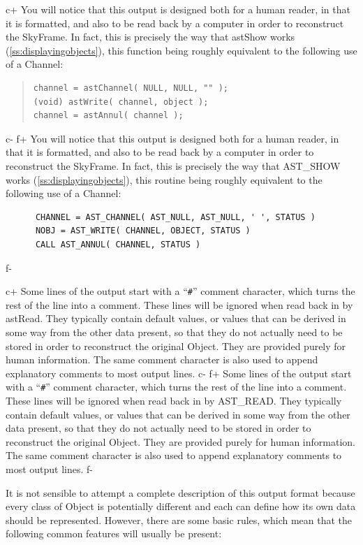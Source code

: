 \documentclass[twoside,11pt]{article}
\newcommand{\secref}[1]{\S\ref{#1}}
\renewcommand{\secref}[1]{\ref{#1}}
\begin{document}
c+
You will notice that this output is designed both for a human reader,
in that it is formatted, and also to be read back by a computer in
order to reconstruct the SkyFrame. In fact, this is precisely the way
that astShow works (\secref{ss:displayingobjects}), this function being
roughly equivalent to the following use of a Channel:

\begin{quote}
\small
\begin{verbatim}
channel = astChannel( NULL, NULL, "" );
(void) astWrite( channel, object );
channel = astAnnul( channel );
\end{verbatim}
\normalsize
\end{quote}
c-
f+
You will notice that this output is designed both for a human reader,
in that it is formatted, and also to be read back by a computer in
order to reconstruct the SkyFrame. In fact, this is precisely the way
that AST\_SHOW works (\secref{ss:displayingobjects}), this routine
being roughly equivalent to the following use of a Channel:

\small
\begin{verbatim}
      CHANNEL = AST_CHANNEL( AST_NULL, AST_NULL, ' ', STATUS )
      NOBJ = AST_WRITE( CHANNEL, OBJECT, STATUS )
      CALL AST_ANNUL( CHANNEL, STATUS )
\end{verbatim}
\normalsize
f-

c+
Some lines of the output start with a ``\verb?#?'' comment character,
which turns the rest of the line into a comment. These lines will be
ignored when read back in by astRead.  They typically contain default
values, or values that can be derived in some way from the other data
present, so that they do not actually need to be stored in order to
reconstruct the original Object. They are provided purely for human
information. The same comment character is also used to append
explanatory comments to most output lines.
c-
f+
Some lines of the output start with a ``\verb?#?'' comment character,
which turns the rest of the line into a comment. These lines will be
ignored when read back in by AST\_READ.  They typically contain
default values, or values that can be derived in some way from the
other data present, so that they do not actually need to be stored in
order to reconstruct the original Object. They are provided purely for
human information. The same comment character is also used to append
explanatory comments to most output lines.
f-

It is not sensible to attempt a complete description of this output
format because every class of Object is potentially different and each
can define how its own data should be represented. However, there are
some basic rules, which mean that the following common features will
usually be present:
\end{document}
